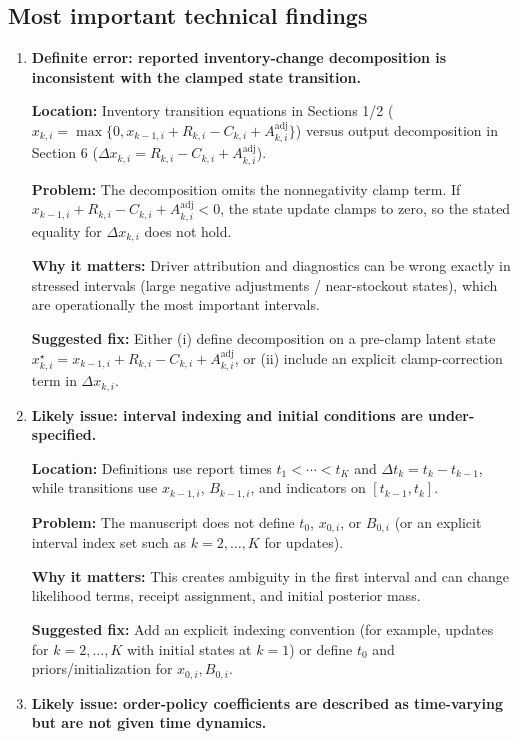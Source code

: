 \documentclass[11pt]{article}
\begin{document}
\subsection*{Most important technical findings}
\begin{enumerate}[leftmargin=*]

\item \textbf{Definite error: reported inventory-change decomposition is inconsistent with the clamped state transition.}

\textbf{Location:} Inventory transition equations in Sections 1/2 ($x_{k,i}=\max\{0, x_{k-1,i}+R_{k,i}-C_{k,i}+A^{\mathrm{adj}}_{k,i}\}$) versus output decomposition in Section 6 ($\Delta x_{k,i}=R_{k,i}-C_{k,i}+A^{\mathrm{adj}}_{k,i}$).

\textbf{Problem:} The decomposition omits the nonnegativity clamp term. If $x_{k-1,i}+R_{k,i}-C_{k,i}+A^{\mathrm{adj}}_{k,i}<0$, the state update clamps to zero, so the stated equality for $\Delta x_{k,i}$ does not hold.

\textbf{Why it matters:} Driver attribution and diagnostics can be wrong exactly in stressed intervals (large negative adjustments / near-stockout states), which are operationally the most important intervals.

\textbf{Suggested fix:} Either (i) define decomposition on a pre-clamp latent state $x^\star_{k,i}=x_{k-1,i}+R_{k,i}-C_{k,i}+A^{\mathrm{adj}}_{k,i}$, or (ii) include an explicit clamp-correction term in $\Delta x_{k,i}$.

\item \textbf{Likely issue: interval indexing and initial conditions are under-specified.}

\textbf{Location:} Definitions use report times $t_1<\cdots<t_K$ and $\Delta t_k=t_k-t_{k-1}$, while transitions use $x_{k-1,i}$, $B_{k-1,i}$, and indicators on $[t_{k-1},t_k]$.

\textbf{Problem:} The manuscript does not define $t_0$, $x_{0,i}$, or $B_{0,i}$ (or an explicit interval index set such as $k=2,\ldots,K$ for updates).

\textbf{Why it matters:} This creates ambiguity in the first interval and can change likelihood terms, receipt assignment, and initial posterior mass.

\textbf{Suggested fix:} Add an explicit indexing convention (for example, updates for $k=2,\dots,K$ with initial states at $k=1$) or define $t_0$ and priors/initialization for $x_{0,i},B_{0,i}$.

\item \textbf{Likely issue: order-policy coefficients are described as time-varying but are not given time dynamics.}


\end{enumerate}
\end{document}
